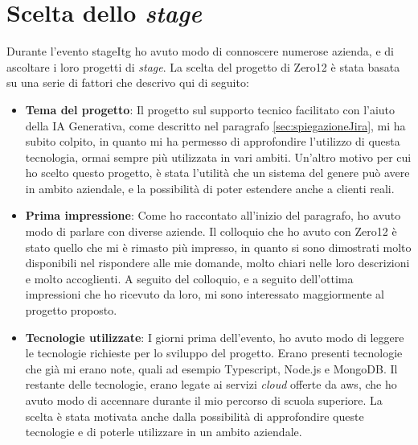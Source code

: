 \section{Scelta dello \textit{stage}} \label{sec:sceltaStage}
Durante l'evento \gls{stageItg} ho avuto modo di connoscere numerose azienda, e di ascoltare i loro progetti di \textit{stage}. 
La scelta del progetto di Zero12 è stata basata su una serie di fattori che descrivo qui di seguito:
\begin{itemize}
    \item \textbf{Tema del progetto}: Il progetto sul supporto tecnico facilitato con l'aiuto della IA Generativa, come descritto nel paragrafo \ref{sec:spiegazioneJira}, mi ha subito colpito, in quanto mi ha permesso di approfondire l'utilizzo di questa tecnologia, ormai sempre più utilizzata in vari ambiti. Un'altro motivo per cui ho scelto questo progetto, è stata l'utilità che un sistema del genere può avere in ambito aziendale, e la possibilità di poter estendere anche a clienti reali.
    \item \textbf{Prima impressione}: Come ho raccontato all'inizio del paragrafo, ho avuto modo di parlare con diverse aziende. Il colloquio che ho avuto con Zero12 è stato quello che mi è rimasto più impresso, in quanto si sono dimostrati molto disponibili nel rispondere alle mie domande, molto chiari nelle loro descrizioni e molto accoglienti. A seguito del colloquio, e a seguito dell'ottima impressioni che ho ricevuto da loro, mi sono interessato maggiormente al progetto proposto.
    \item \textbf{Tecnologie utilizzate}: I giorni prima dell'evento, ho avuto modo di leggere le tecnologie richieste per lo sviluppo del progetto. Erano presenti tecnologie che già mi erano note, quali ad esempio Typescript, Node.js e MongoDB. Il restante delle tecnologie, erano legate ai servizi \textit{cloud} offerte da \gls{aws}, che ho avuto modo di accennare durante il mio percorso di scuola superiore. La scelta è stata motivata anche dalla possibilità di approfondire queste tecnologie e di poterle utilizzare in un ambito aziendale.
\end{itemize}

